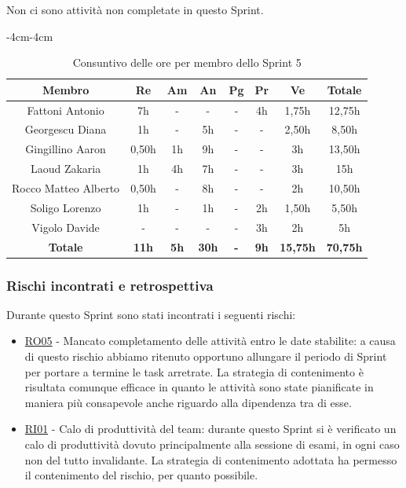 \documentclass[a4paper,12pt]{article}
\begin{document}
Non ci sono attività non completate in questo Sprint.

\begin{table}[H]
    \begin{adjustwidth}{-4cm}{-4cm}
    \centering
    \begin{tabular}{|c|c|c|c|c|c|c|c|}
        \hline
        \textbf{Membro} & \textbf{Re} & \textbf{Am}  & \textbf{An} & \textbf{Pg} & \textbf{Pr} & \textbf{Ve} & \textbf{Totale} \\
        \hline
        Fattoni Antonio & 7h & - & - & - & 4h & 1,75h & 12,75h \\
        \hline
        Georgescu Diana & 1h & - & 5h & - & - & 2,50h & 8,50h \\
        \hline
        Gingillino Aaron & 0,50h & 1h & 9h & - & - & 3h & 13,50h \\
        \hline
        Laoud Zakaria & 1h & 4h & 7h & - & - & 3h & 15h \\
        \hline
        Rocco Matteo Alberto & 0,50h & - & 8h & - & - & 2h & 10,50h \\
        \hline
        Soligo Lorenzo & 1h & - & 1h & - & 2h & 1,50h & 5,50h \\
        \hline
        Vigolo Davide & - & - & - & - & 3h & 2h & 5h \\
        \hline
        \textbf{Totale} & \textbf{11h} & \textbf{5h} & \textbf{30h} & \textbf{-} & \textbf{9h} & \textbf{15,75h} & \textbf{70,75h} \\
        \hline
    \end{tabular}
    \caption{Consuntivo delle ore per membro dello Sprint 5}
    \end{adjustwidth}
\end{table}

\subsubsection{Rischi incontrati e retrospettiva}
Durante questo Sprint sono stati incontrati i seguenti rischi:
\begin{itemize}
    \item \hyperref[RO05]{RO05} - Mancato completamento delle attività entro le date stabilite: a causa di questo rischio abbiamo ritenuto opportuno allungare il periodo di Sprint per portare a termine le task arretrate. La strategia di contenimento è risultata comunque efficace in quanto le attività sono state pianificate in maniera più consapevole anche riguardo alla dipendenza tra di esse.
    \item \hyperref[RI01]{RI01} - Calo di produttività del team: durante questo Sprint si è verificato un calo di produttività dovuto principalmente alla sessione di esami, in ogni caso non del tutto invalidante. La strategia di contenimento adottata ha permesso il contenimento del rischio, per quanto possibile.
\end{itemize}
\end{document}

